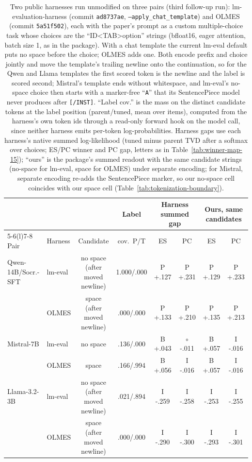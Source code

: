 \begin{table}[t]
\centering\scriptsize
\setlength{\tabcolsep}{2.5pt}
\begin{tabular}{@{}llcccccc@{}}
\toprule
& & & Label & \multicolumn{2}{c}{Harness summed gap} & \multicolumn{2}{c}{Ours, same candidates} \\
\cmidrule(lr){5-6}\cmidrule(l){7-8}
Pair & Harness & Candidate & cov.\ P/T & ES & PC & ES & PC \\
\midrule
Qwen-14B/Socr.-SFT & lm-eval & no space (after moved newline) & 1.000/.000 & P +.127 & P +.231 & P +.129 & P +.233 \\
 & OLMES & space (after moved newline) & .000/.000 & P +.133 & P +.210 & P +.135 & P +.213 \\
\addlinespace[2pt]
Mistral-7B & lm-eval & no space & .136/.000 & B +.043 & $\circ$ -.011 & B +.057 & I -.016 \\
 & OLMES & space & .166/.994 & B +.056 & I -.016 & B +.057 & I -.016 \\
\addlinespace[2pt]
Llama-3.2-3B & lm-eval & no space (after moved newline) & .021/.894 & I -.259 & I -.258 & I -.253 & I -.255 \\
 & OLMES & space (after moved newline) & .000/.000 & I -.290 & I -.300 & I -.293 & I -.301 \\
\bottomrule
\end{tabular}
\caption{Two public harnesses run unmodified on three pairs (third follow-up run): lm-evaluation-harness (commit \texttt{ad8737ae}, \texttt{--apply\_chat\_template}) and OLMES (commit \texttt{5a51f502}), each with the paper's prompt as a custom multiple-choice task whose choices are the ``ID<TAB>option'' strings (bfloat16, eager attention, batch size 1, as in the package). With a chat template the current lm-eval default puts no space before the choice; OLMES adds one. Both encode prefix and choice jointly and move the template's trailing newline onto the continuation, so for the Qwen and Llama templates the first scored token is the newline and the label is scored second; Mistral's template ends without whitespace, and lm-eval's no-space choice then starts with a marker-free ``\texttt{A}'' that its SentencePiece model never produces after \texttt{[/INST]}. ``Label cov.'' is the mass on the distinct candidate tokens at the label position (parent/tuned, mean over items), computed from the harness's own token ids through a read-only forward hook on the model call, since neither harness emits per-token log-probabilities. Harness gaps use each harness's native summed log-likelihood (tuned minus parent TVD after a softmax over choices; ES/PC winner and PC gap, letters as in Table~\ref{tab:winner-map-15}); ``ours'' is the package's summed readout with the same candidate strings (no-space for lm-eval, space for OLMES) under separate encoding; for Mistral, separate encoding re-adds the SentencePiece marker, so our no-space cell coincides with our space cell (Table~\ref{tab:tokenization-boundary}).}
\label{tab:harness}
\end{table}

